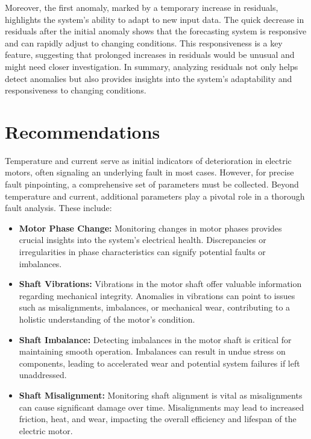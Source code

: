 Moreover, the first anomaly, marked by a temporary increase in residuals, highlights the system's ability to adapt to new input data. The quick decrease in residuals after the initial anomaly shows that the forecasting system is responsive and can rapidly adjust to changing conditions. This responsiveness is a key feature, suggesting that prolonged increases in residuals would be unusual and might need closer investigation. In summary, analyzing residuals not only helps detect anomalies but also provides insights into the system's adaptability and responsiveness to changing conditions.

\clearpage 


\section {Recommendations}

Temperature and current serve as initial indicators of deterioration in electric motors, often signaling an underlying fault in most cases. However, for precise fault pinpointing, a comprehensive set of parameters must be collected. Beyond temperature and current, additional parameters play a pivotal role in a thorough fault analysis. These include:

\begin{itemize}
    \item \textbf{Motor Phase Change:}
    Monitoring changes in motor phases provides crucial insights into the system's electrical health. Discrepancies or irregularities in phase characteristics can signify potential faults or imbalances.

    \item \textbf{Shaft Vibrations:}
    Vibrations in the motor shaft offer valuable information regarding mechanical integrity. Anomalies in vibrations can point to issues such as misalignments, imbalances, or mechanical wear, contributing to a holistic understanding of the motor's condition.

    \item \textbf{Shaft Imbalance:}
    Detecting imbalances in the motor shaft is critical for maintaining smooth operation. Imbalances can result in undue stress on components, leading to accelerated wear and potential system failures if left unaddressed.

    \item \textbf{Shaft Misalignment:}
    Monitoring shaft alignment is vital as misalignments can cause significant damage over time. Misalignments may lead to increased friction, heat, and wear, impacting the overall efficiency and lifespan of the electric motor.
\end{itemize}


